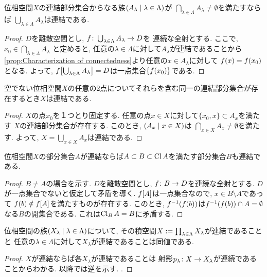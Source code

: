 \documentclass[uplatex, dvipdfmx, a4paper, 12pt, class=jsbook, crop=false]{standalone}
\begin{document}
\begin{proposition}
	\label{prop:Sum of every connected subsets in a family having intersection is connected}
	位相空間$ X $の連結部分集合からなる族$ \setfamily{A_\lambda}{\lambda \in \Lambda} $が
	$ \bigcap_{\lambda \in \Lambda} A_\lambda \neq \emptyset $を満たすならば
	$ \bigcup_{\lambda \in \Lambda} A_\lambda $は連結である.
\end{proposition}

\begin{proof}
	$ D $を離散空間とし, $ f\colon\bigcup_{\lambda \in \Lambda} A_\lambda\to D $を
	連続な全射とする. ここで, $ x_0 \in \bigcap_{\lambda \in \Lambda} A_\lambda $
	と定めると, 任意の$ \lambda \in \Lambda $に対して$ A_\lambda $が連結であることから
	\cref{prop:Characterization of connectedness}より任意の$ x \in A_\lambda $に対して
	$ \mappt{f}{x} = \mappt{f}{x_0} $となる.
	よって, $ \mapset{f}{\bigcup_{\lambda \in \Lambda} A_\lambda}= D $は一点集合$ \{\mappt{f}{x_0}\} $である.
\end{proof}

\begin{corollary}
	空でない位相空間$ X $の任意の2点についてそれらを含む同一の連結部分集合が存在するとき$ X $は連結である.
\end{corollary}

\begin{proof}
	$ X $の点$ x_0 $を１つとり固定する. 任意の点$ x \in X $に対して$ \{x_0, x\} \subset A_x $を満たす
	$ X $の連結部分集合が存在する. このとき, $ \setfamily{A_x}{x \in X} $は
	$ \bigcap_{x \in X} A_x \neq \emptyset$を満たす. よって, $ X = \bigcup_{x \in X} A_x $は連結である.
\end{proof}

\begin{proposition}
	\label{prop:Closure of a connected subspace is connected}
	位相空間$ X $の部分集合$ A $が連結ならば$ A \subset B \subset \mathop{\mathrm{Cl}}\nolimits A $を満たす部分集合$ B $も連結である.
\end{proposition}

\begin{proof}
	$ B \neq A $の場合を示す. $ D $を離散空間とし, $ f\colon B\to D $を連続な全射とする.
	$ D $が一点集合でないと仮定して矛盾を導く.
	$ \mapset{f}{A} $は一点集合なので, $ x \in B \setminus A $であって
	$ \mappt{f}{b} \notin \mapset{f}{A} $を満たすものが存在する.
	このとき, $ \mapinvpt{f}{\mappt{f}{b}} $は$ \mapinvpt{f}{\mappt{f}{b}} \cap A = \emptyset $なる$ B $の開集合である.
	これは$ \mathop{\mathrm{Cl}}\nolimits_B A = B $に矛盾する.
\end{proof}

\begin{proposition}
	\label{prop:A product space of connected spaces is connected}
	位相空間の族$ \setfamily{X_\lambda}{\lambda \in \Lambda} $について,
	その積空間$ X \mathrel{:=} \prod_{\lambda \in \Lambda} X_\lambda $が連結であることと
	任意の$ \lambda \in \Lambda $に対して$ X_\lambda $が連結であることは同値である.
\end{proposition}

\begin{proof}
	$ X $が連結ならば各$ X_\lambda $が連結であることは
	射影$ p_\lambda\colon X\to X_\lambda $が連続であることからわかる.
	以降では逆を示す.
	\WIP.
\end{proof}
\end{document}
